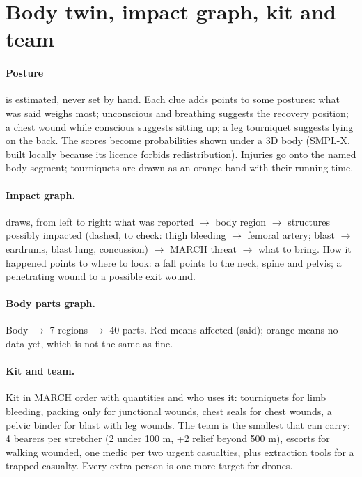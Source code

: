 \section{Body twin, impact graph, kit and team}

\paragraph{Posture} is estimated, never set by hand. Each clue adds points to some postures: what was said
weighs most; unconscious and breathing suggests the recovery position; a chest wound while conscious suggests
sitting up; a leg tourniquet suggests lying on the back. The scores become probabilities shown under a 3D body
(SMPL-X, built locally because its licence forbids redistribution). Injuries go onto the named body segment;
tourniquets are drawn as an orange band with their running time.

\paragraph{Impact graph.}  draws, from left to right: what was reported $\rightarrow$ body
region $\rightarrow$ structures possibly impacted (dashed, to check: thigh bleeding $\rightarrow$ femoral artery;
blast $\rightarrow$ eardrums, blast lung, concussion) $\rightarrow$ MARCH threat $\rightarrow$ what to bring. How it
happened points to where to look: a fall points to the neck, spine and pelvis; a penetrating wound to a possible
exit wound.

\paragraph{Body parts graph.} Body $\rightarrow$ 7 regions $\rightarrow$ 40 parts. Red means affected (said); orange
means no data yet, which is not the same as fine.

\paragraph{Kit and team.} Kit in MARCH order with quantities and who uses it: tourniquets for limb bleeding, packing
only for junctional wounds, chest seals for chest wounds, a pelvic binder for blast with leg wounds. The team is
the smallest that can carry: 4 bearers per stretcher (2 under 100 m, +2 relief beyond 500 m), escorts for walking
wounded, one medic per two urgent casualties, plus extraction tools for a trapped casualty. Every extra person is
one more target for drones.

